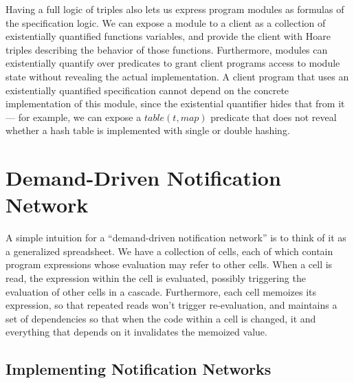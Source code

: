 \documentclass[preprint,natbib]{sigplanconf}
\begin{document}
Having a full logic of triples also lets us express program modules as
formulas of the specification logic. We can expose a module to a
client as a collection of existentially quantified functions
variables, and provide the client with Hoare triples describing the
behavior of those functions. Furthermore, modules can existentially
quantify over predicates to grant client programs access to module
state without revealing the actual implementation. A client program
that uses an existentially quantified specification cannot depend on
the concrete implementation of this module, since the existential
quantifier hides that from it --- for example, we can expose a
$table(t, map)$ predicate that does not reveal whether a hash table is
implemented with single or double hashing.

\section{Demand-Driven Notification Network}

A simple intuition for a ``demand-driven notification network'' is to
think of it as a generalized spreadsheet. We have a collection of
cells, each of which contain program expressions whose evaluation may
refer to other cells. When a cell is read, the expression within the
cell is evaluated, possibly triggering the evaluation of other cells
in a cascade. Furthermore, each cell memoizes its expression, so that
repeated reads won't trigger re-evaluation, and maintains a set of
dependencies so that when the code within a cell is changed, it and
everything that depends on it invalidates the memoized value.

\subsection{Implementing Notification Networks}
\end{document}
